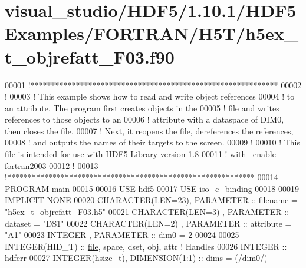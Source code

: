 \hypertarget{visual__studio_2_h_d_f5_21_810_81_2_h_d_f5_examples_2_f_o_r_t_r_a_n_2_h5_t_2h5ex__t__objrefatt___f03_8f90_source}{}\section{visual\+\_\+studio/\+H\+D\+F5/1.10.1/\+H\+D\+F5\+Examples/\+F\+O\+R\+T\+R\+A\+N/\+H5\+T/h5ex\+\_\+t\+\_\+objrefatt\+\_\+\+F03.f90}
\label{visual__studio_2_h_d_f5_21_810_81_2_h_d_f5_examples_2_f_o_r_t_r_a_n_2_h5_t_2h5ex__t__objrefatt___f03_8f90_source}

\begin{DoxyCode}
00001 \textcolor{comment}{!************************************************************}
00002 \textcolor{comment}{!}
00003 \textcolor{comment}{!  This example shows how to read and write object references}
00004 \textcolor{comment}{!  to an attribute.  The program first creates objects in the}
00005 \textcolor{comment}{!  file and writes references to those objects to an}
00006 \textcolor{comment}{!  attribute with a dataspace of DIM0, then closes the file.}
00007 \textcolor{comment}{!  Next, it reopens the file, dereferences the references,}
00008 \textcolor{comment}{!  and outputs the names of their targets to the screen.}
00009 \textcolor{comment}{!}
00010 \textcolor{comment}{!  This file is intended for use with HDF5 Library version 1.8}
00011 \textcolor{comment}{!  with --enable-fortran2003}
00012 \textcolor{comment}{!}
00013 \textcolor{comment}{!************************************************************}
00014 \textcolor{keyword}{PROGRAM} main
00015 
00016   \textcolor{keywordtype}{USE }hdf5
00017   \textcolor{keywordtype}{USE }iso\_c\_binding
00018 
00019   \textcolor{keywordtype}{IMPLICIT NONE}
00020   \textcolor{keywordtype}{CHARACTER(LEN=23)}, \textcolor{keywordtype}{PARAMETER} :: filename  = \textcolor{stringliteral}{"h5ex\_t\_objrefatt\_F03.h5"}
00021   \textcolor{keywordtype}{CHARACTER(LEN=3)} , \textcolor{keywordtype}{PARAMETER} :: dataset   = \textcolor{stringliteral}{"DS1"}
00022   \textcolor{keywordtype}{CHARACTER(LEN=2)} , \textcolor{keywordtype}{PARAMETER} :: attribute = \textcolor{stringliteral}{"A1"}
00023   \textcolor{keywordtype}{INTEGER}          , \textcolor{keywordtype}{PARAMETER} :: dim0      = 2
00024 
00025   \textcolor{keywordtype}{INTEGER(HID\_T)}  :: \hyperlink{structfile}{file}, space, dset, obj, attr \textcolor{comment}{! Handles}
00026   \textcolor{keywordtype}{INTEGER} :: hdferr
00027   \textcolor{keywordtype}{INTEGER(hsize\_t)},   \textcolor{keywordtype}{DIMENSION(1:1)} :: dims = (/dim0/)

\end{DoxyCode}
